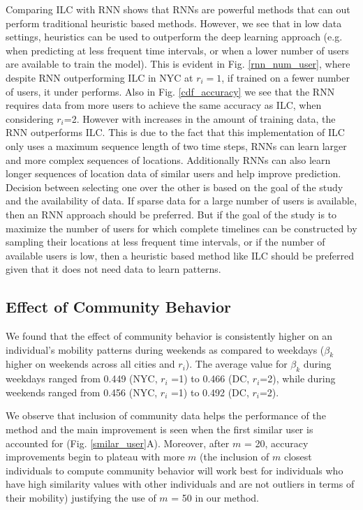 Comparing ILC with RNN shows that RNNs are powerful methods that can out perform traditional heuristic based methods. However, we see that in low data settings, heuristics can be used to outperform the deep learning approach (e.g. when predicting at less frequent time intervals, or when a lower number of users are available to train the model). This is evident in Fig. \ref{rnn_num_user}, where despite RNN outperforming ILC in NYC at $r_i=1$, if trained on a fewer number of users, it under performs. Also in Fig. \ref{cdf_accuracy} we see that the RNN requires data from more users to achieve the same accuracy as ILC, when considering $r_i$=2. However with increases in the amount of training data, the RNN outperforms ILC. This is due to the fact that this implementation of ILC only uses a maximum sequence length of two time steps, RNNs can learn larger and more complex sequences of locations. Additionally RNNs can also learn longer sequences of location data of similar users and help improve prediction. Decision between selecting one over the other is based on the goal of the study and the availability of data. If sparse data for a large number of users is available, then an RNN approach should be preferred. But if the goal of the study is to maximize the number of users for which complete timelines can be constructed by sampling their locations at less frequent time intervals, or if the number of available users is low, then a heuristic based method like ILC should be preferred given that it does not need data to learn patterns. 

\subsection{Effect of Community Behavior}
We found that the effect of community behavior is consistently higher on an individual's mobility patterns during weekends as compared to weekdays ($\beta_k$ higher on weekends across all cities and $r_i$). The average value for $\beta_k$ during weekdays ranged from 0.449 (NYC, $r_i$ =1) to 0.466 (DC, $r_i$=2), while during weekends ranged from 0.456 (NYC, $r_i$ =1) to 0.492 (DC, $r_i$=2).

We observe that inclusion of community data helps the performance of the method and the main improvement is seen when the first similar user is accounted for (Fig. \ref{smilar_user}A). Moreover, after $m$ = 20, 
accuracy improvements begin to plateau with more $m$ (the inclusion of $m$ closest individuals to compute community behavior will work best for individuals who have high similarity values with other individuals and are not outliers in terms of their mobility) justifying the use of $m$ = 50 in our method. 


